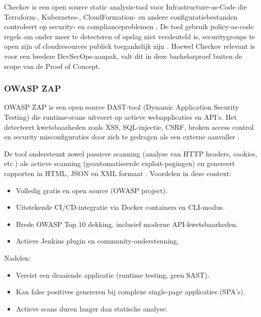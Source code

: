 Checkov is een open source static analysis-tool voor Infrastructure-as-Code die\\Terraform-, Kubernetes-, CloudFormation- en andere configuratiebestanden controleert op security- en complianceproblemen \autocite{CheckovDoc,CheckovGithub}. De tool gebruik policy-as-code regels om onder meer te detecteren of opslag niet versleuteld is, securitygroups te open zijn of cloudresources publiek toegankelijk zijn \autocite{CheckovTerraformGuide}. Hoewel Checkov relevant is voor een bredere DevSecOps-aanpak, valt dit in deze bachelorproef buiten de scope van de Proof of Concept.

\subsubsection{OWASP ZAP}
OWASP ZAP is een open source DAST-tool (Dynamic Application Security Testing) die runtime-scans uitvoert op actieve webapplicaties en API's. Het detecteert kwetsbaarheden zoals XSS, SQL-injectie, CSRF, broken access control en security misconfiguraties door zich te gedragen als een externe aanvaller \autocite{AppSecSanta2025,OWASPZAPDocs}.

De tool ondersteunt zowel passieve scanning (analyse van HTTP headers, cookies, etc.) als actieve scanning (geautomatiseerde exploit-pogingen) en genereert rapporten in HTML, JSON en XML formaat \autocite{OWASPZAPGithub}.
Voordelen in deze context:
\begin{itemize}
  \item Volledig gratis en open source (OWASP project).
  \item Uitstekende CI/CD-integratie via Docker containers en CLI-modus.
  \item Brede OWASP Top 10 dekking, inclusief moderne API-kwetsbaarheden.
  \item Actieve Jenkins plugin en community-ondersteuning.
\end{itemize}

Nadelen:
\begin{itemize}
  \item Vereist een draaiende applicatie (runtime testing, geen SAST).
  \item Kan false positives genereren bij complexe single-page applicaties (SPA's).
  \item Actieve scans duren langer dan statische analyse.
\end{itemize}

